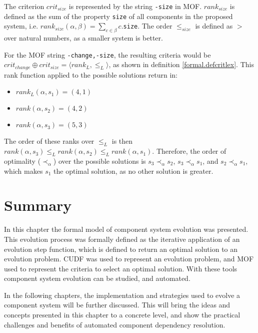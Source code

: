 The criterion $crit_{size}$ is represented by the string \verb+-size+ in MOF.
$rank_{size}$ is defined as the sum of the property \verb+size+ of all components in the  proposed system, i.e. $rank_{size}(\alpha,\beta) = \sum_{c \in \beta} c$.\verb+size+.
The order $\leq_{size}$ is defined as $>$ over natural numbers, as a smaller system is better. 

For the MOF string \verb+-change,-size+, the resulting criteria would be $crit_{change} \oplus crit_{size} = \langle rank_L, \leq_L \rangle$, as shown in definition \ref{formal.defcritlex}.
This rank function applied to the possible solutions return in:
\begin{itemize}
  \item $rank_L(\alpha,s_1) = (4, 1)$
  \item $rank(\alpha,s_2) = (4, 2)$
  \item $rank(\alpha,s_3) = (5, 3)$
\end{itemize}
The order of these ranks over $\leq_L$ is then $rank(\alpha,s_3) \leq_L rank(\alpha,s_2) \leq_L rank(\alpha,s_1)$.
Therefore, the order of optimality ($\prec_{\alpha}$) over the possible solutions is $s_3 \prec_{\alpha} s_2$, $s_3 \prec_{\alpha} s_1$, and $s_2 \prec_{\alpha} s_1$,
which makes $s_1$ the optimal solution, as no other solution is greater. 

\section{Summary}
In this chapter the formal model of component system evolution was presented.
This evolution process was formally defined as the iterative application of an evolution step function,
which is defined to return an optimal solution to an evolution problem.
CUDF was used to represent an evolution problem, and MOF used to represent the criteria to select an optimal solution.
With these tools component system evolution can be studied, and automated.

In the following chapters, the implementation and strategies used to evolve a component system will be further discussed.
This will bring the ideas and concepts presented in this chapter to a concrete level, and show the practical challenges and benefits of automated component dependency resolution. 